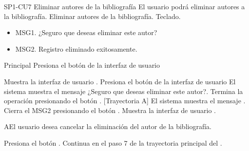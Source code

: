 \begin{UseCase} {SP1-CU7} {Eliminar autores de la bibliografía} {El usuario podrá eliminar autores a la bibliografía.}
		 {Eliminar autores de la bibliografía.}
		 {}
		 {Teclado.}
		 {
        	\begin{itemize}
        		\item MSG1. ¿Seguro que deseas eliminar este autor?
                \item MSG2. Registro eliminado exitosamente.
        	\end{itemize}
        }
\end{UseCase}

\begin{UCtrayectoria}{Principal}
\UCpaso[\UCactor] Presiona el botón  de la interfaz de usuario 


\UCpaso Muestra la interfaz de usuario .
\UCpaso[\UCactor] Presiona el botón  de la interfaz de usuario 
\UCpaso El sistema muestra el mensaje  {¿Seguro que deseas eliminar este autor?}.
\UCpaso[\UCactor] Termina la operación presionando el botón . [Trayectoria A] 
\UCpaso El sistema muestra el mensaje .   
\UCpaso[\UCactor] Cierra el MSG2 presionando el botón .
\UCpaso Muestra la interfaz de usuario .
\end{UCtrayectoria}


\begin{UCtrayectoriaA}{A}{El usuario desea cancelar la eliminación del autor de la bibliografía.}

\UCpaso[\UCactor] Presiona el botón .
\UCpaso Continua en el paso 7 de la trayectoria principal del .

\end{UCtrayectoriaA}
